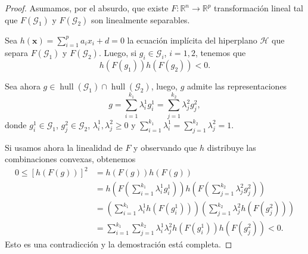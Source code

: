 \documentclass[12pt, a4paper]{amsbook}
\def\hull{\operatorname {\mathrm{hull}}}
\newcommand{\R}{{\mathbb R}}
\newcommand{\Hc}{{\mathcal H}}
\newcommand{\G}{{\mathcal G}}
\newcommand{\xx}{{\mathbf x}}
\theoremstyle{remark}
\theoremstyle{definition}
\numberwithin{section}{chapter}
\numberwithin{subsection}{section}
\numberwithin{equation}{section}
\numberwithin{figure}{chapter}
\begin{document}
\begin{proof}
Asumamos, por el absurdo, que existe $F\colon \R^n\to\R^p$ transformación lineal tal que $F(\G_1)$ y $F(\G_2)$ son linealmente separables. 

Sea $h(\xx) = \sum_{i=1}^p a_i x_i + d=0$ la ecuación implícita del hiperplano $\Hc$ que separa $F(\G_1)$ y $F(\G_2)$. Luego, si $g_i\in \G_i$, $i=1, 2$, tenemos que
$$
h(F(g_1))h(F(g_2)) < 0.
$$

Sea ahora $g\in \hull(\G_1)\cap\hull(\G_2)$, luego, $g$ admite las representaciones
$$
g=\sum_{i=1}^{k_1} \lambda_i^1 g_i^1 = \sum_{j=1}^{k_2}\lambda_j^2 g_j^2,
$$
donde $g_i^1\in \G_1$, $g_j^2\in \G_2$, $\lambda_i^1, \lambda_j^2\ge 0$ y $\sum_{i=1}^{k_1}\lambda_i^1 = \sum_{j=1}^{k_2}\lambda_j^2 = 1$.

Si usamos ahora la linealidad de $F$ y observando que $h$ distribuye las combinaciones convexas, obtenemos
\begin{align*}
0\le \left[h(F(g))\right]^2 & = h(F(g)) h(F(g))\\
&= h\left(F\left(\sum_{i=1}^{k_1} \lambda_i^1 g_i^1\right)\right) h\left(F\left(\sum_{j=1}^{k_2} \lambda_j^2 g_j^2\right)\right)\\
&= \left(\sum_{i=1}^{k_1} \lambda_i^1 h(F(g_i^1))\right) \left(\sum_{j=1}^{k_2} \lambda_j^2 h(F(g_j^2))\right)\\
&= \sum_{i=1}^{k_1}\sum_{j=1}^{k_2} \lambda_i^1\lambda_j^2 h(F(g_i^1)) h(F(g_j^2)) < 0.
\end{align*}
Esto es una contradicción y la demostración está completa.
\end{proof}
\end{document}
